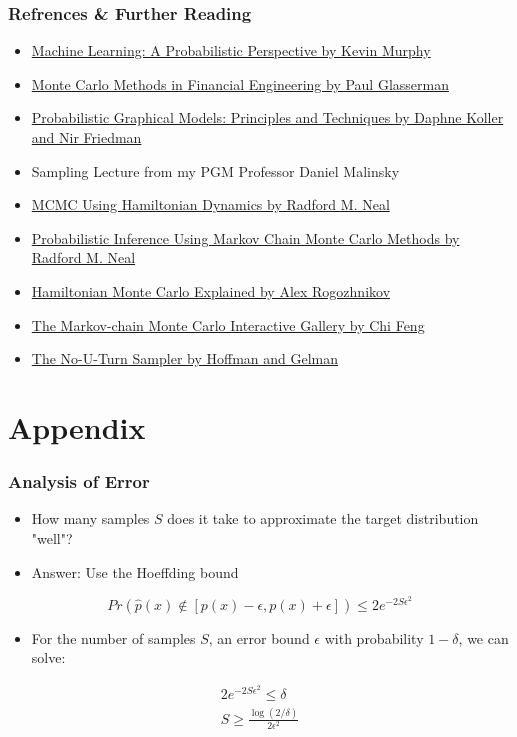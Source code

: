 \documentclass{beamer}
\begin{document}
\begin{frame}
\frametitle{Refrences \& Further Reading}
  \begin{itemize}
    \item \href{https://www.cs.ubc.ca/~murphyk/MLbook/}{Machine Learning: A Probabilistic Perspective by Kevin Murphy}
    \item \href{https://www.springer.com/gp/book/9780387004518}{Monte Carlo Methods in Financial Engineering by Paul Glasserman}
    \item \href{https://mitpress.mit.edu/books/probabilistic-graphical-models}{Probabilistic Graphical Models: Principles and Techniques by Daphne Koller and Nir Friedman}
    \item Sampling Lecture from my PGM Professor Daniel Malinsky
    \item \href{http://www.mcmchandbook.net/HandbookChapter5.pdf}{MCMC Using Hamiltonian Dynamics by Radford M. Neal}
    \item \href{http://www.cs.utoronto.ca/~radford/ftp/review.pdf}{Probabilistic Inference Using Markov Chain Monte Carlo Methods by Radford M. Neal}
    \item \href{http://arogozhnikov.github.io/2016/12/19/markov_chain_monte_carlo.html}{Hamiltonian Monte Carlo Explained by Alex Rogozhnikov}
    \item \href{https://chi-feng.github.io/mcmc-demo/app.html}{The Markov-chain Monte Carlo Interactive Gallery by Chi Feng}
    \item \href{http://www.stat.columbia.edu/~gelman/research/published/nuts.pdf}{The No-U-Turn Sampler by Hoffman and Gelman}
  \end{itemize}
\end{frame}


\section{Appendix}
\begin{frame}
  \frametitle{Analysis of Error}
  \begin{itemize}
    \item How many samples $S$ does it take to approximate the target distribution "well"?
    \item Answer: Use the Hoeffding bound
  \end{itemize}
  \begin{equation*}
    Pr \left( \hat{p}(x) \not\in \left[p(x) - \epsilon, p(x) + \epsilon \right] \right) \leq 2 e^{-2S \epsilon^2}
  \end{equation*}
  \begin{itemize}
    \item For the number of samples $S$, an error bound $\epsilon$ with probability $1 - \delta$,
      we can solve:
  \end{itemize}
  \begin{gather*}
    2e^{-2S \epsilon^2} \leq \delta \\
    S \geq \frac{\log(2 / \delta)}{2 \epsilon^2}  \\
  \end{gather*}
\end{frame}
\end{document}
